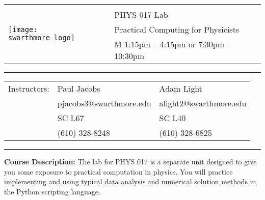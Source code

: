 \documentclass[12pt,letterpaper]{article}
\begin{document}
\setlength\parindent{0mm}

\newcommand{\myparskip}{\vspace{2mm}}
\newcommand{\headingskip}{\vspace{1mm}}

\begin{tabular}{ l l }
  \multirow{4}{*}{\texttt{[image: swarthmore\_logo]}} 
  &\\
  \headingskip
  & \large PHYS 017 Lab \\
  \headingskip
  & \large Practical Computing for Physicists \\
  \headingskip
  & \large M 1:15pm -- 4:15pm or 7:30pm -- 10:30pm\\
\end{tabular}

\begin{center}
  \rule{0.9\textwidth}{0.1pt}
\end{center}

\begin{center}
\setlength{\tabcolsep}{18pt}
\begin{tabular}{ l l l } 
  Instructors: & Paul Jacobs & Adam Light \\
& pjacobs3@swarthmore.edu & alight2@swarthmore.edu \\
& SC L67   & SC L40 \\
& (610) 328-8248   & (610) 328-6825 \\
\end{tabular}

  \rule{0.9\textwidth}{0.1pt}
\end{center}

\textbf {\large Course Description:}  
The lab for PHYS 017 is a separate unit designed to give you some exposure to practical computation in physics.  
You will practice implementing and using typical data analysis and numerical solution methods in the Python scripting language.\\
\end{document}
